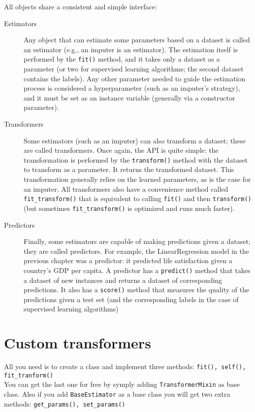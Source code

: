 \documentclass[french]{article}
\begin{document}
All objects share a consistent and simple interface:
\begin{description}
  \item [Estimators] Any object that can estimate some parameters based on a dataset is called an estimator (e.g., an imputer is an estimator). The estimation itself is performed by the \lstinline{fit()} method, and it takes only a dataset as a parameter (or two for supervised learning algorithms; the second dataset contains the labels). Any other parameter needed to guide the estimation process is considered a hyperparameter (such as an imputer’s strategy), and it must be set as an instance variable (generally via a constructor parameter).
  \item [Transformers] Some estimators (such as an imputer) can also transform a dataset; these are called transformers. Once again, the API is quite simple: the transformation is performed by the \lstinline{transform()} method with the dataset to transform as a parameter. It returns the transformed dataset. This transformation generally relies on the learned parameters, as is the case for an imputer. All transformers also have a convenience method called \lstinline{fit_transform()} that is equivalent to calling \lstinline{fit()} and then \lstinline{transform()} (but sometimes \lstinline{fit_transform()} is optimized and runs much faster).
  \item [Predictors] Finally, some estimators are capable of making predictions given a dataset; they are called predictors. For example, the LinearRegression model in the previous chapter was a predictor: it predicted life satisfaction given a country’s GDP per capita. A predictor has a \lstinline{predict()} method that takes a dataset of new instances and returns a dataset of corresponding predictions. It also has a \lstinline{score()} method that measures the quality of the predictions given a test set (and the corresponding labels in the case of supervised learning
algorithms)
\end{description}


\section{Custom transformers}

All you need is to create a class and implement three methods: \lstinline{fit(), self(), fit_tranform()}\\

You can get the last one for free by symply adding \lstinline{TransformerMixin} as base class. Also if you add \lstinline{BaseEstimator} as a base class you will get two extra methods: \lstinline{get_params(), set_params()}
\end{document}
